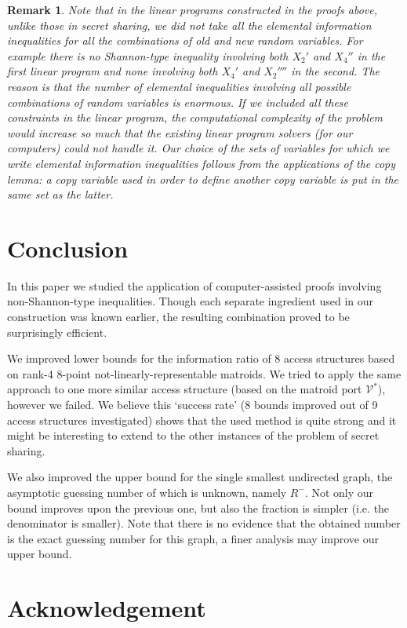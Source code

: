 \documentclass[11pt, a4paper]{kybernetika}
\newtheorem{remark}[theorem]{Remark}
\begin{document}
	\begin{remark}
		Note that in the linear programs constructed in the proofs above, unlike those in secret sharing, we did not take all the elemental information inequalities for all the combinations of old and new random variables. For example there is no Shannon-type inequality involving both $X_2'$ and $X_4''$ in the first linear program and none involving both $X_4'$ and $X_2''''$ in the second. The reason is that the number of elemental inequalities involving all possible combinations of random variables is enormous. If we included all these constraints in the linear program, the computational complexity of the problem would increase so much that the existing linear program solvers (for our computers) could not handle it. Our choice of the sets of variables for which we write elemental information inequalities follows from the applications of the copy lemma: a copy variable used in order to define another copy variable is put in the same set as the latter.
	\end{remark}
	
	\section{Conclusion}
	In this paper we studied the application of computer-assisted proofs involving non-Shannon-type inequalities. Though each separate ingredient used in our construction was known earlier, the resulting combination proved to be surprisingly efficient.
	
	We improved lower bounds for the information ratio of 8 access structures based on rank-4 8-point not-linearly-representable matroids. We tried to apply the same approach to one more similar access structure (based on the matroid port $\mathcal{V}^*$), however we failed. We believe this `success rate' (8 bounds improved out of 9 access structures investigated) shows that the used method is quite strong and it might be interesting to extend to the other instances of the problem of secret sharing. 
	
	We also improved the upper bound for the single smallest undirected graph, the asymptotic guessing number of which is unknown, namely $R^-$. Not only our bound improves upon the previous one, but also the fraction is simpler (i.e. the denominator is smaller). Note that there is no evidence that the obtained number is the exact guessing number for this graph, a finer analysis may improve our upper bound.
	
	\section{Acknowledgement}
	
\end{document}
